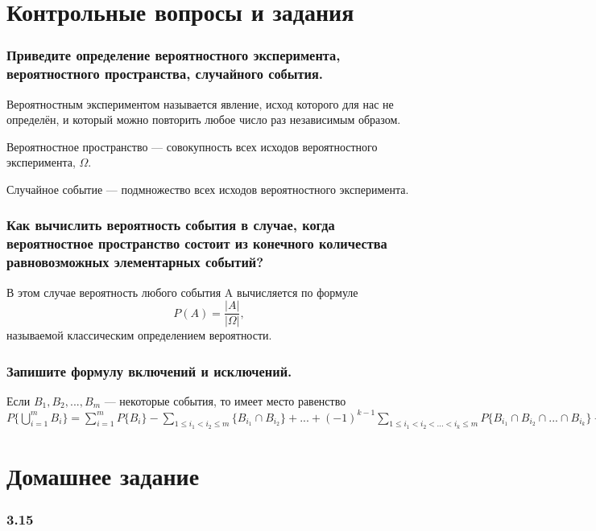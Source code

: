 \documentclass{book}
\begin{document}
\section*{Контрольные вопросы и задания}

\subsubsection*{Приведите определение вероятностного эксперимента, вероятностного пространства, случайного события.}

Вероятностным экспериментом называется явление, исход которого для нас не определён, и который можно повторить любое число раз независимым образом.

Вероятностное пространство --- совокупность всех исходов вероятностного эксперимента, $\Omega$.

Случайное событие --- подмножество всех исходов вероятностного эксперимента.

\subsubsection*{Как вычислить вероятность события в случае, когда вероятностное пространство состоит из конечного количества равновозможных элементарных событий?}

В этом случае вероятность любого события A вычисляется по формуле $$P(A)=\frac{|A|}{|\Omega|},$$ называемой классическим определением вероятности.

\subsubsection*{Запишите формулу включений и исключений.}

Если $B_1, B_2, ..., B_m$ --- некоторые события, то имеет место равенство $P\{\bigcup\limits_{i=1}^mB_i\}=\sum\limits_{i=1}^mP\{B_i\}-\sum\limits_{1\leq i_1<i_2\leq m}\{B_{i_1}\cap B_{i_2}\}+...+(-1)^{k-1}\sum\limits_{1\leq i_1<i_2<...<i_k\leq m}P\{B_{i_1}\cap B_{i_2}\cap...\cap B_{i_k}\}+...+(-1)^{m-1}P\{B_1\cap B_2\cap...\cap B_m\}.$

\section*{Домашнее задание}

\subsubsection*{3.15}
\end{document}
